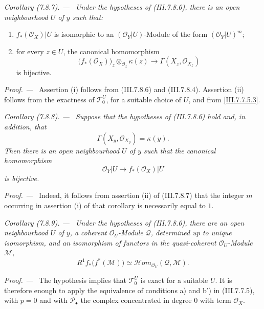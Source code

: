 \documentclass[10pt,oneside]{book}
\newcommand{\sh}[1]{\mathscr{#1}}
\newcommand{\kres}{\kappa}
\newcommand{\shHom}{\mathscr{H}\!om}
\newcommand{\sref}[2][]{(#2)}
\newenvironment{corollary}[1][]{\par\medskip\noindent\itshape Corollary (#1). ---\ }{\par}
\newenvironment{proof}{\par\medskip\noindent\textit{Proof. ---\ }}{\par}
\begin{document}
\begin{corollary}[7.8.7]
\label{III.7.8.7}
Under the hypotheses of \sref{III.7.8.6}, there is an open
neighbourhood $U$ of $y$ such that:
\begin{enumerate}
  \item[(i)] $f_*(\sh{O}_X)|U$ is isomorphic to an
  $(\sh{O}_Y|U)$-Module of the form $(\sh{O}_Y|U)^m$;
  \item[(ii)] for every $z\in U$, the canonical
  homomorphism
  \[
    \bigl(f_*(\sh{O}_X)\bigr)_z
      \otimes_{\sh{O}_z}\kres(z)
    \longrightarrow
    \Gamma(X_z,\sh{O}_{X_z})
  \]
  is bijective.
\end{enumerate}
\end{corollary}

\begin{proof}
Assertion (i) follows from \sref{III.7.8.6} and
\sref{III.7.8.4}.  Assertion (ii) follows from the
exactness of $\sh{T}_0^U$, for a suitable choice of $U$,
and from \eqref{III.7.7.5.3}.
\end{proof}

\begin{corollary}[7.8.8]
\label{III.7.8.8}
Suppose that the hypotheses of \sref{III.7.8.6} hold and,
in addition, that
\[
  \Gamma(X_y,\sh{O}_{X_y})=\kres(y).
\]
Then there is an open neighbourhood $U$ of $y$ such that
the canonical homomorphism
\[
  \sh{O}_Y|U\longrightarrow f_*(\sh{O}_X)|U
\]
is bijective.
\end{corollary}

\begin{proof}
Indeed, it follows from assertion (ii) of
\sref{III.7.8.7} that the integer $m$ occurring in
assertion (i) of that corollary is necessarily equal to
$1$.
\end{proof}

\begin{corollary}[7.8.9]
\label{III.7.8.9}
Under the hypotheses of \sref{III.7.8.6}, there are an open
neighbourhood $U$ of $y$, a coherent $\sh{O}_U$-Module
$\sh{Q}$, determined up to unique isomorphism, and an
isomorphism of functors in the quasi-coherent
$\sh{O}_U$-Module $\sh{M}$,
\[
  R^1f_*\bigl(f^*(\sh{M})\bigr)
  \simeq
  \shHom_{\sh{O}_U}(\sh{Q},\sh{M}).
  \tag{7.8.9.1}\label{III.7.8.9.1}
\]
\end{corollary}

\begin{proof}
The hypothesis implies that $\sh{T}_0^U$ is exact for a
suitable $U$.  It is therefore enough to apply the
equivalence of conditions a) and b') in
\sref{III.7.7.5}, with $p=0$ and with
$\sh{P}_\bullet$ the complex concentrated in degree $0$
with term $\sh{O}_X$.
\end{proof}
\end{document}
